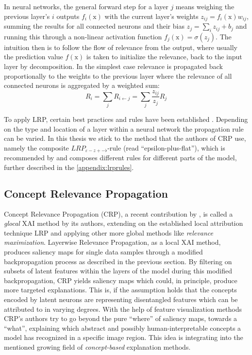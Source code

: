 In neural networks, the general forward step for a layer $j$ means weighing the previous layer's $i$ outputs $f_i(\mathrm{x})$ with the current layer's weights $z_{ij} = f_i(\mathrm{x}) w_{ij}$, summing the results for all connected neurons and their bias $z_{j} = \sum_{i} z_{ij} + b_j$ and running this through a non-linear activation function $f_j(\mathrm{x}) = \sigma (z_j)$.
The intuition then is to follow the flow of relevance from the output, where usually the prediction value $f(\mathrm{x})$ is taken to initialize the relevance, back to the input layer by decomposition. In the simplest case relevance is propagated back proportionally to the weights to the previous layer where the relevance of all connected neurons is aggregated by a weighted sum:
\begin{equation}\label{eq:basic_attribution_rule}
    R_i = \sum_{j}  R_{i \leftarrow j} = \sum_{j} \frac{z_{ij}}{z_j} R_j
\end{equation}

To apply LRP, certain best practices and rules have been established \citep{Kohlbrenner2020, Montavon2019, Samek2021}. Depending on the type and location of a layer within a neural network the propagation rule can be varied. In this thesis we stick to the method that the authors of CRP use, namely the composite $LRP_{\varepsilon-z+-\flat}$-rule (read ``epsilon-plus-flat''), which is recommended by \cite{Kohlbrenner2020} and composes different rules for different parts of the model, further described in the \cref{appendix:lrprules}.

\subsection{Concept Relevance Propagation}\label{section:crp_background}
Concept Relevance Propagation (CRP), a recent contribution by \cite{Achtibat2022}, is called a \textit{glocal} XAI method by its authors, extending on the established local attribution technique LRP \cite{Bach2015} and applying other more global methods like \textit{relevance maximization}. 
Layerwise Relevance Propagation, as a local XAI method, produces saliency maps for single data samples through a modified backpropagation process as described in the previous section. By filtering on subsets of latent features within the layers of the model during this modified backpropagation, CRP yields saliency maps which could, in principle, produce more targeted explanations. This is, if the assumption holds that the concepts encoded by latent neurons are representing disentangled features which can be attributed to in varying degrees. With the help of feature visualization methods CRP's authors try to go beyond the pure ``where'' of saliency maps, towards a ``what'', explaining which abstract and possibly human-interpretable concepts a model has recognized in a specific image region. This idea is integrating into the mentioned growing field of \textit{concept-based} explanation methods.

